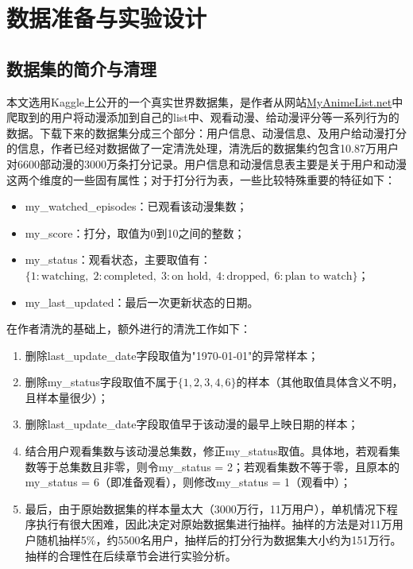 
\chapter{数据准备与实验设计}
  \section{数据集的简介与清理}
  本文选用Kaggle上公开的一个真实世界数据集，是作者从网站\url{MyAnimeList.net}中爬取到的用户将动漫添加到自己的list中、观看动漫、给动漫评分等一系列行为的数据。下载下来的数据集分成三个部分：用户信息、动漫信息、及用户给动漫打分的信息，作者已经对数据做了一定清洗处理，清洗后的数据集约包含10.87万用户对6600部动漫的3000万条打分记录。用户信息和动漫信息表主要是关于用户和动漫这两个维度的一些固有属性；对于打分行为表，一些比较特殊重要的特征如下：
  \begin{itemize}
    \item my\_watched\_episodes：已观看该动漫集数；
    \item my\_score：打分，取值为0到10之间的整数；
    \item my\_status：观看状态，主要取值有：$\{1:\text{watching},\;2:\text{completed},\;3:\text{on hold},\;4:\text{dropped},\;6:\text{plan to watch}\}$；
    \item my\_last\_updated：最后一次更新状态的日期。
  \end{itemize}

  在作者清洗的基础上，额外进行的清洗工作如下：
  \begin{enumerate}
    \item 删除last\_update\_date字段取值为"1970-01-01"的异常样本；
    \item 删除my\_status字段取值不属于$\{1,2,3,4,6\}$的样本（其他取值具体含义不明，且样本量很少）；
    \item 删除last\_update\_date字段取值早于该动漫的最早上映日期的样本；
    \item 结合用户观看集数与该动漫总集数，修正my\_status取值。具体地，若观看集数等于总集数且非零，则令my\_status = 2；若观看集数不等于零，且原本的my\_status = 6（即准备观看），则修改my\_status = 1（观看中）；
    \item 最后，由于原始数据集的样本量太大（3000万行，11万用户），单机情况下程序执行有很大困难，因此决定对原始数据集进行抽样。抽样的方法是对11万用户随机抽样5\%，约5500名用户，抽样后的打分行为数据集大小约为151万行。抽样的合理性在后续章节会进行实验分析。
  \end{enumerate}


